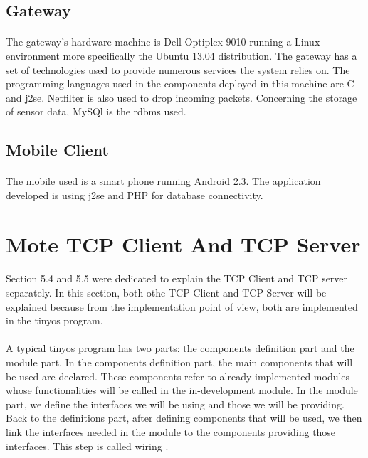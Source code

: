 \documentclass[12pt,a4paper,final]{report}
\begin{document}
\subsection{Gateway}
\paragraph{}
The gateway's hardware machine is Dell Optiplex 9010 running a Linux environment more specifically the Ubuntu 13.04 distribution. The gateway has a set of technologies used to provide numerous services the system relies on. The programming languages used in the components deployed in this machine are C and \gls{j2se}. Netfilter is also used to drop incoming packets. Concerning the storage of sensor data, MySQl is the \gls{rdbms} used.

\subsection{Mobile Client}
\paragraph{}
The mobile used is a smart phone running Android 2.3. The application developed is using \gls{j2se} and PHP for database connectivity.

\section{Mote TCP Client And TCP Server}
\paragraph{}
Section 5.4 and 5.5 were dedicated to explain the TCP Client and TCP server separately. In this section, both othe TCP Client and TCP Server will be explained because from the implementation point of view,  both are implemented in the \gls{tinyos} program.
\paragraph{}
A typical \gls{tinyos} program has two parts: the components definition part and the module part. In the components definition part, the main components that will be used are declared. These components refer to already-implemented modules whose functionalities will be called in the in-development module. In the module part, we define the interfaces we will be using and those we will be providing. Back to the definitions part, after defining components that will be used, we then link the interfaces needed in the module to the components providing those interfaces. This step is called wiring \cite{ref14}.
\end{document}
